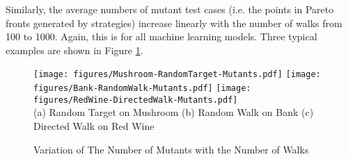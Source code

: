 \documentclass[preprint,1p,authoryear,times]{elsarticle}
\begin{document}
Similarly, the average numbers of mutant test cases (i.e. the points in Pareto fronts generated by strategies) increase linearly with the number of walks from 100 to 1000. Again, this is for all machine learning models. Three typical examples are shown in Figure \ref{fig:CaseStudyMutants}. 

\begin{figure}[h]
	\centering
	\texttt{[image: figures/Mushroom-RandomTarget-Mutants.pdf]}
	\texttt{[image: figures/Bank-RandomWalk-Mutants.pdf]}
	\texttt{[image: figures/RedWine-DirectedWalk-Mutants.pdf]}\\
	\scriptsize{(a) Random Target on Mushroom \hspace{0.8cm} (b) Random Walk on Bank \hspace{0.9cm} (c) Directed Walk on Red Wine} 
	\caption{Variation of The Number of Mutants with the Number of Walks}
	\label{fig:CaseStudyMutants}
\end{figure}
\end{document}
